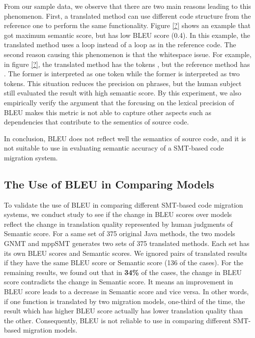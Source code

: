 From our sample data, we observe that there are two main reasons leading 
to this phenomenon.
%
First, a translated method can use different code structure from the 
reference one to perform the same functionality. Figure \ref{?} shows an example
that got maximum semantic score, but has low BLEU score (0.4). In this example, 
the translated method uses a  loop instead of a  
loop as in the reference code. The second reason causing this phenomenon 
is that the whitespace issue. For example, in figure \ref{?}, the translated method has the 
tokens , but the reference method has . The former 
is interpreted as one token while the former is interpreted as two tokens. 
This situation reduces the precision on phrases, but the human subject still
evaluated the result with high semantic score. By this experiment, we also empirically 
verify the argument that the forcusing on the lexical precision of BLEU makes
this metric is not able to capture other aspects such as dependencies 
that contribute to the sementics of source code.

In conclusion, BLEU does not reflect well the
semantics of source code, and it is not suitable to use in evaluating
semantic accuracy of a SMT-based code migration system.

\subsection{The Use of BLEU in Comparing Models}
To validate the use of BLEU in comparing different SMT-based code migration systems, we conduct study to see if the change in BLEU scores over models reflect the change in translation quality represented by human judgments of Semantic score. For a same set of 375 original Java methods, the two models GNMT and mppSMT generates two sets of 375 translated methods. Each set has its own BLEU scores and Semantic scores. We ignored pairs of translated results if they have the same BLEU score or Semantic score (136 of the cases). For the remaining results, we found out that in \textbf{34\%} of the cases, the change in BLEU score contradicts the change in Semantic score. It means an improvement in BLEU score leads to a decrease in Semantic score and vice versa. In other words, if one function is translated by two migration models, one-third of the time, the result which has higher BLEU score actually has lower translation quality than the other. Consequently, BLEU is not reliable to use in comparing different SMT-based migration models. 

